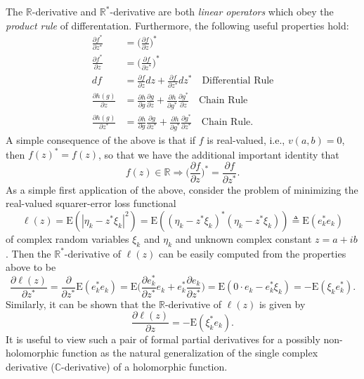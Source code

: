 \documentclass[11pt]{article}
\begin{document}
The $\mathbb R$-derivative and $\mathbb R^*$-derivative are both \textit{linear operators} which obey the \textit{product rule} of differentation. Furthermore, the following useful properties hold:
\begin{equation*}
\begin{split}
\frac{\partial f^*}{\partial z^* } &=\Bigg( \frac{\partial f}{\partial z}\Bigg)^*\\
\frac{\partial f^*}{\partial z } &=\Bigg( \frac{\partial f}{\partial z^*}\Bigg)^*\\
df &= \frac{\partial f}{\partial z} dz + \frac{\partial f}{\partial z^*}dz^*\quad \text{Differential Rule}\\
\frac{\partial h(g)}{\partial z} &= \frac{\partial h}{\partial g}\frac{\partial g}{\partial z} + \frac{\partial h}{\partial g^*}
\frac{\partial g^*}{\partial z}\quad \text{Chain Rule}\\
\frac{\partial h(g)}{\partial z^*} &= \frac{\partial h}{\partial g}\frac{\partial g}{\partial z^*} + \frac{\partial h}{\partial g^*}
\frac{\partial g^*}{\partial z^*}\quad \text{Chain Rule}.
\end{split}
\end{equation*}
A simple consequence of the above is that if $f$ is real-valued, i.e., $v(a,b)=0$, then $f(z)^* = f(z)$, so that we have the additional important identity that
\begin{equation}
f(z)\in\mathbb R\Rightarrow \Big(\frac{\partial f}{\partial z}\Big)^* = \frac{\partial f}{\partial z^*}.
\end{equation}
As a simple first application of the above, consider the problem of minimizing the real-valued squarer-error loss functional
$$\ell(z) = \text{E}(|\eta_k-z^*\xi_k|^2) = \text{E}((\eta_k-z^*\xi_k)^*(\eta_k-z^*\xi_k))\triangleq\text{E}(e^*_ke_k)$$
of complex random variables  $\xi_k$ and $\eta_k$ and unknown complex constant $z = a +ib$. Then the $\mathbb R^*$-derivative of $\ell(z)$ can be easily computed from the properties above to be
$$\frac{\partial \ell(z)}{\partial z^*} = \frac{\partial }{\partial z^*}\text{E}(e^*_ke_k) = \text{E}\Bigg(\frac{\partial e^*_k}{\partial z^*}e_k + e^*_k\frac{\partial e_k}{\partial z^*}\Bigg) = \text{E}(0\cdot e_k - e^*_k\xi_k) = -\text{E}(\xi_k e^*_k).$$
Similarly, it can be shown that the $\mathbb R$-derivative of $\ell(z)$ is given by
$$\frac{\partial \ell(z)}{\partial z} = -\text{E}(\xi^*_k e_k).$$
It is useful to view such a  pair of formal partial derivatives for a possibly non-holomorphic function as the natural generalization of the single complex derivative ($\mathbb C$-derivative) of a holomorphic function.
\end{document}
